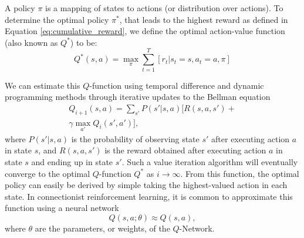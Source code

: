 A policy $\pi$ is a mapping of states to actions (or distribution over actions). To determine the optimal policy $\pi^*$, that leads to the highest reward as defined in Equation \eqref{eq:cumulative_reward}, we define the optimal action-value function (also known as $Q^*$) to be:
\begin{equation}\label{qfunction}
	Q^*(s, a) = \max_\pi \sum_{t=1}^T [r_t \vert s_t=s, a_t=a, \pi]
\end{equation}

We can estimate this $Q$-function using temporal difference and dynamic programming methods through iterative updates to the Bellman equation
\begin{equation}
	\begin{array}{c}
		Q_{i+1}(s, a) = \sum_{s'} P(s' \vert s, a) [R(s,a,s') + \\
		\gamma \max_{a'} Q_i(s', a')],
	\end{array}
\end{equation}
where $P(s'\vert s,a)$ is the probability of observing state $s'$ after executing action $a$ in state $s$, and $R(s,a,s')$ is the reward obtained after executing action $a$ in state $s$ and ending up in state $s'$.
Such a value iteration algorithm will eventually converge to the optimal $Q$-function $Q^*$ as $i \rightarrow \infty$. From this function, the optimal policy can easily be derived by simple taking the highest-valued action in each state. In connectionist reinforcement learning, it is common to approximate this function using a neural network
\begin{equation}
	Q(s, a; \theta) \approx Q(s, a),
\end{equation}
where $\theta$ are the parameters, or weights, of the $Q$-Network.